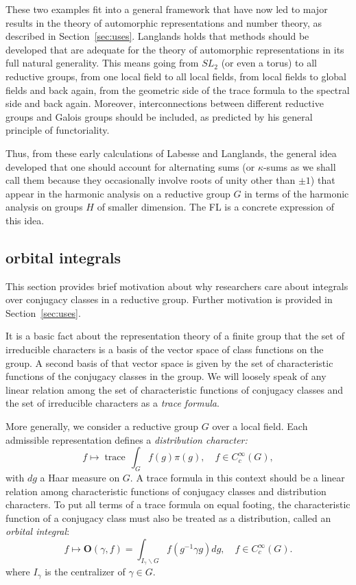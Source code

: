 \documentclass[brochure,english,12pt]{bourbaki}
\def\op#1{{\operatorname{#1}}}
\def\OO{{\mathbf O}}
\begin{document}
  These two examples fit into a general framework that have now led to
  major results in the theory of automorphic representations and
  number theory, as described in Section~\ref{sec:uses}.  Langlands
  holds that methods should be developed that are adequate for the
  theory of automorphic representations in its full natural
  generality.  This means going from $SL_2$ (or even a torus) to all
  reductive groups, from one local field to all local fields, from
  local fields to global fields and back again, from the geometric
  side of the trace formula to the spectral side and back again.
  Moreover, interconnections between different reductive groups and
  Galois groups should be included, as predicted by his general
  principle of functoriality.


Thus, from these early calculations of Labesse and Langlands, the
general idea developed that one should account for alternating sums
(or $\kappa$-sums as we shall call them because they occasionally 
involve roots of unity other than $\pm1$) that appear in the harmonic
analysis on a reductive group $G$ in terms of the harmonic analysis on
groups $H$ of smaller dimension.  The FL is a concrete
expression of this idea.

\subsection{orbital integrals}

This section provides brief motivation about why researchers care about integrals over conjugacy
classes in a reductive group.  Further motivation is provided in Section~\ref{sec:uses}.

It is a basic fact about the representation theory of a finite group that the set of irreducible characters
is a basis of the vector space of class functions on the group.  A second basis of that vector
space is given by the set of characteristic functions of the conjugacy classes in the group.
We will loosely speak of any linear relation among the set of characteristic functions of conjugacy classes
and the set
of irreducible characters as a {\it trace formula}.

More generally, we consider a reductive group $G$ over a local field.
Each admissible representation defines a {\it distribution character:}
\[
f\mapsto
\op{trace}\,\int_G f(g)\pi(g),\quad  f\in C_c^\infty(G),
\]
with $dg$  a Haar measure on $G$.
A trace formula in this context should be a linear
relation among characteristic functions of conjugacy classes and
distribution characters.  To put all terms of a trace formula on equal
footing, the characteristic function of a conjugacy class must also be
treated as a distribution, called an {\it orbital integral}:
\[
f\mapsto \OO(\gamma,f) = \int_{I_\gamma\backslash G} f(g^{-1}\gamma g) dg,\quad f\in C_c^\infty(G).
\]
where $I_\gamma$ is the centralizer of $\gamma\in G$.
\end{document}
